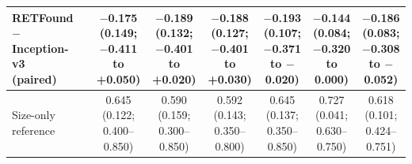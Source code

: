\begin{tabular}{@{}l*{6}{c}*{6}{c}@{}}
\makecell[l]{RETFound $-$\\Inception-v3 (paired)} & \multicolumn{6}{c}{} & \makecell{$-$0.175\\{\scriptsize (0.149; $-$0.411 to +0.050)}} & \makecell{$-$0.189\\{\scriptsize (0.132; $-$0.401 to +0.020)}} & \makecell{$-$0.188\\{\scriptsize (0.127; $-$0.401 to +0.030)}} & \makecell{$-$0.193\\{\scriptsize (0.107; $-$0.371 to $-$0.020)}} & \makecell{$-$0.144\\{\scriptsize (0.084; $-$0.320 to 0.000)}} & \makecell{$-$0.186\\{\scriptsize (0.083; $-$0.308 to $-$0.052)}} \\
\midrule
Size-only reference & \multicolumn{6}{c}{} & \makecell{0.645\\{\scriptsize (0.122; 0.400--0.850)}} & \makecell{0.590\\{\scriptsize (0.159; 0.300--0.850)}} & \makecell{0.592\\{\scriptsize (0.143; 0.350--0.800)}} & \makecell{0.645\\{\scriptsize (0.137; 0.350--0.850)}} & \makecell{0.727\\{\scriptsize (0.041; 0.630--0.750)}} & \makecell{0.618\\{\scriptsize (0.101; 0.424--0.751)}} \\
\bottomrule
\end{tabular}
